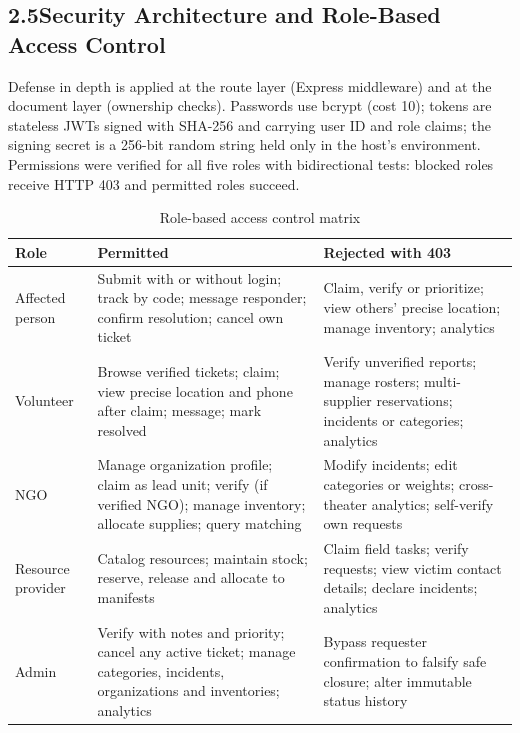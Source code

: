 \documentclass[11pt,a4paper]{article}
\begin{document}
\subsection{2.5\quad Security Architecture and Role-Based Access Control}\label{s25}

Defense in depth is applied at the route layer (Express middleware) and at the document layer (ownership checks). Passwords use bcrypt (cost 10); tokens are stateless JWTs signed with SHA-256 and carrying user ID and role claims; the signing secret is a 256-bit random string held only in the host's environment. Permissions were verified for all five roles with bidirectional tests: blocked roles receive HTTP 403 and permitted roles succeed.

\renewcommand{\arraystretch}{1.2}
\begin{table}[H]
\centering
\footnotesize
\begin{tabularx}{\textwidth}{@{}p{0.85in}XX@{}}
\toprule
\textbf{Role} & \textbf{Permitted} & \textbf{Rejected with 403}\\
\midrule
Affected person & Submit with or without login; track by code; message responder; confirm resolution; cancel own ticket & Claim, verify or prioritize; view others' precise location; manage inventory; analytics\\
\addlinespace
Volunteer & Browse verified tickets; claim; view precise location and phone after claim; message; mark resolved & Verify unverified reports; manage rosters; multi-supplier reservations; incidents or categories; analytics\\
\addlinespace
NGO & Manage organization profile; claim as lead unit; verify (if verified NGO); manage inventory; allocate supplies; query matching & Modify incidents; edit categories or weights; cross-theater analytics; self-verify own requests\\
\addlinespace
Resource provider & Catalog resources; maintain stock; reserve, release and allocate to manifests & Claim field tasks; verify requests; view victim contact details; declare incidents; analytics\\
\addlinespace
Admin & Verify with notes and priority; cancel any active ticket; manage categories, incidents, organizations and inventories; analytics & Bypass requester confirmation to falsify safe closure; alter immutable status history\\
\bottomrule
\end{tabularx}
\caption{Role-based access control matrix}
\end{table}
\renewcommand{\arraystretch}{1}
\end{document}
